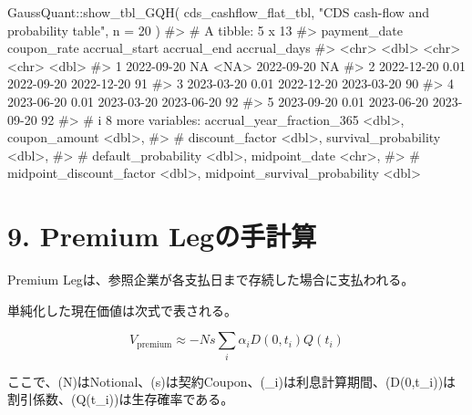 \documentclass[
  letterpaper,
  DIV=11,
  numbers=noendperiod]{scrreprt}
\newenvironment{Shaded}{\begin{snugshade}}{\end{snugshade}}
\newcommand{\AttributeTok}[1]{\textcolor[rgb]{0.40,0.45,0.13}{#1}}
\newcommand{\CommentTok}[1]{\textcolor[rgb]{0.37,0.37,0.37}{#1}}
\newcommand{\DecValTok}[1]{\textcolor[rgb]{0.68,0.00,0.00}{#1}}
\newcommand{\FunctionTok}[1]{\textcolor[rgb]{0.28,0.35,0.67}{#1}}
\newcommand{\NormalTok}[1]{\textcolor[rgb]{0.00,0.23,0.31}{#1}}
\newcommand{\SpecialCharTok}[1]{\textcolor[rgb]{0.37,0.37,0.37}{#1}}
\newcommand{\StringTok}[1]{\textcolor[rgb]{0.13,0.47,0.30}{#1}}
\begin{document}
\begin{Shaded}
\begin{Highlighting}[]
\NormalTok{GaussQuant}\SpecialCharTok{::}\FunctionTok{show\_tbl\_GQH}\NormalTok{(}
\NormalTok{  cds\_cashflow\_flat\_tbl,}
  \StringTok{"CDS cash{-}flow and probability table"}\NormalTok{,}
  \AttributeTok{n =} \DecValTok{20}
\NormalTok{)}
\CommentTok{\#\textgreater{} \# A tibble: 5 x 13}
\CommentTok{\#\textgreater{}   payment\_date coupon\_rate accrual\_start accrual\_end accrual\_days}
\CommentTok{\#\textgreater{}   \textless{}chr\textgreater{}              \textless{}dbl\textgreater{} \textless{}chr\textgreater{}         \textless{}chr\textgreater{}              \textless{}dbl\textgreater{}}
\CommentTok{\#\textgreater{} 1 2022{-}09{-}20         NA    \textless{}NA\textgreater{}          2022{-}09{-}20            NA}
\CommentTok{\#\textgreater{} 2 2022{-}12{-}20          0.01 2022{-}09{-}20    2022{-}12{-}20            91}
\CommentTok{\#\textgreater{} 3 2023{-}03{-}20          0.01 2022{-}12{-}20    2023{-}03{-}20            90}
\CommentTok{\#\textgreater{} 4 2023{-}06{-}20          0.01 2023{-}03{-}20    2023{-}06{-}20            92}
\CommentTok{\#\textgreater{} 5 2023{-}09{-}20          0.01 2023{-}06{-}20    2023{-}09{-}20            92}
\CommentTok{\#\textgreater{} \# i 8 more variables: accrual\_year\_fraction\_365 \textless{}dbl\textgreater{}, coupon\_amount \textless{}dbl\textgreater{},}
\CommentTok{\#\textgreater{} \#   discount\_factor \textless{}dbl\textgreater{}, survival\_probability \textless{}dbl\textgreater{},}
\CommentTok{\#\textgreater{} \#   default\_probability \textless{}dbl\textgreater{}, midpoint\_date \textless{}chr\textgreater{},}
\CommentTok{\#\textgreater{} \#   midpoint\_discount\_factor \textless{}dbl\textgreater{}, midpoint\_survival\_probability \textless{}dbl\textgreater{}}
\end{Highlighting}
\end{Shaded}

\section{9. Premium
Legの手計算}\label{premium-legux306eux624bux8a08ux7b97}

Premium Legは、参照企業が各支払日まで存続した場合に支払われる。

単純化した現在価値は次式で表される。

\[
V_{\mathrm{premium}}
\approx
-Ns
\sum_i
\alpha_i
D(0,t_i)
Q(t_i)
\]

ここで、(N)はNotional、(s)は契約Coupon、(\alpha\_i)は利息計算期間、(D(0,t\_i))は割引係数、(Q(t\_i))は生存確率である。
\end{document}
